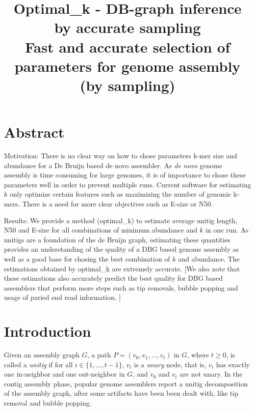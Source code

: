 \documentclass[a4paper,11pt]{article}
\newcommand{\kristoffer}[1]{{\color{red}{#1}}}
\begin{document}
\title{Optimal\_k - DB-graph inference by accurate sampling \\Fast and accurate selection of parameters for genome assembly (by sampling)} 
\author{}
\date{} %
\maketitle

\section{Abstract}
Motivation: There is no clear way on how to chose parameters k-mer size and abundance for a De Bruijn based de novo assembler. As \emph{de novo} genome assembly is time consuming for large genomes, it is of importance to chose these parameters well in order to prevent multiple runs. Current software for estimating $k$ only optimize certain features such as maximizing the number of genomic k-mers. There is a need for more clear objectives such as E-size or N50.

Results:
We provide a method (optimal\_k) to estimate average unitig length, N50 and E-size for all combinations of minimum abundance and $k$ in one run. As unitigs are a foundation of the de Bruijn graph, estimating these quantities provides an understanding of the quality of a DBG based genome assembly as well as a good base for chosing the best combination of $k$ and abundance. The estimations obtained by optimal\_k are extremely accurate. [We also note that these estimations also accurately predict the best quality for DBG based assemblers that perform more steps such as tip removals, bubble popping and usage of paried end read information. ]

\section{Introduction} %
\label{sec:introduction}

\kristoffer{ Mention that there are not many tools for computing optimal parameters at all. And make sure to mention that memry is not the issue. Mention the positives about our methods like speed and clear objective function but make sure to mention that it's memory requiring but thats not a problem if you are going to do the assembly anyway!!}

Given an assembly graph $G$, a path $P = (v_0,v_1,\dots,v_t)$ in $G$, where $t \geq 0$, is called a \emph{unitig} if for all $i \in \{1,\dots,t-1\}$, $v_i$ is a \emph{unary} node, that is, $v_i$ has exactly one in-neighbor and one out-neighbor in $G$, and $v_0$ and $v_{t}$ are not unary. In the contig assembly phase, popular genome assemblers report a unitig decomposition of the assembly graph, after some artifacts have been been dealt with, like tip removal and bubble popping.
\end{document}
